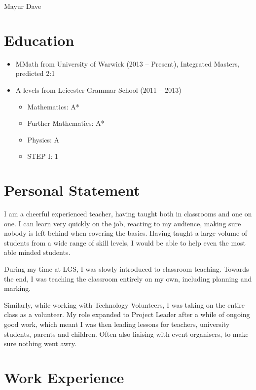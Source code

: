 \documentclass[letterpaper]{article}
\def\name{Mayur Dave}
\begin{document}
	
	{\huge \name}
	
	\vspace{0.25in}
	

	\section*{Education}
	
	\begin{itemize}
		\item MMath from University of Warwick (2013 -- Present), Integrated Masters, predicted 2:1
		
		\item A levels from Leicester Grammar School (2011 -- 2013)
		\begin{itemize}
			\item Mathematics: A*
			\item Further Mathematics:  A*
			\item Physics:  A
			\item STEP I:  1
		\end{itemize}
	\end{itemize}
	
	\section*{Personal Statement}
	I am a cheerful experienced teacher, having taught both in classrooms and one on one. I can learn very quickly on the job, reacting to my audience, making sure nobody is left behind when covering the basics. Having taught a large volume of students from a wide range of skill levels, I would be able to help even the most able minded students.
	
	During my time at LGS, I was slowly introduced to classroom teaching. Towards the end, I was teaching the classroom entirely on my own, including planning and marking.
	
	Similarly, while working with Technology Volunteers, I was taking on the entire class as a volunteer.
	My role expanded to Project Leader after a while of ongoing good work, which meant I was then leading lessons for teachers, university students, parents and children.
	Often also liaising with event organisers, to make sure nothing went awry.
	
	\section*{Work Experience}
	
\end{document}
